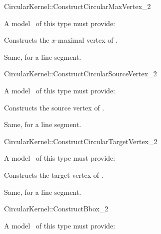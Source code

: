 \begin{ccRefFunctionObjectConcept}{CircularKernel::ConstructCircularMaxVertex_2} 


A model \ccVar\ of this type must provide:

{Constructs the $x$-maximal vertex of .
}

{Same, for a line segment.}

\end{ccRefFunctionObjectConcept}

\begin{ccRefFunctionObjectConcept}{CircularKernel::ConstructCircularSourceVertex_2} 


A model \ccVar\ of this type must provide:

{Constructs the source vertex of .}

{Same, for a line segment.}

\end{ccRefFunctionObjectConcept}

\begin{ccRefFunctionObjectConcept}{CircularKernel::ConstructCircularTargetVertex_2} 


A model \ccVar\ of this type must provide:

{Constructs the target vertex of .}

{Same, for a line segment.}

\end{ccRefFunctionObjectConcept}

\begin{ccRefFunctionObjectConcept}{CircularKernel::ConstructBbox_2}


A model \ccVar\ of this type must provide:

{}

{}

{}

\end{ccRefFunctionObjectConcept}


